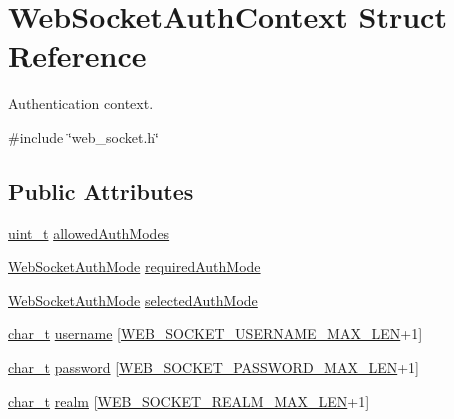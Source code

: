 \hypertarget{structWebSocketAuthContext}{}\section{Web\+Socket\+Auth\+Context Struct Reference}
\label{structWebSocketAuthContext}


Authentication context.  




{\ttfamily \#include \char`\"{}web\+\_\+socket.\+h\char`\"{}}

\subsection*{Public Attributes}
\begin{DoxyCompactItemize}
\item 
\hyperlink{compiler__port_8h_a12a1e9b3ce141648783a82445d02b58d}{uint\+\_\+t} \hyperlink{structWebSocketAuthContext_adb63e01f01d517c51fec717e2d3cf21e}{allowed\+Auth\+Modes}
\item 
\hyperlink{web__socket_8h_a2c2f8d99948379e06bb22ea64745ba77}{Web\+Socket\+Auth\+Mode} \hyperlink{structWebSocketAuthContext_a50c3cdd7ca2e85e2f1de07c0312320aa}{required\+Auth\+Mode}
\item 
\hyperlink{web__socket_8h_a2c2f8d99948379e06bb22ea64745ba77}{Web\+Socket\+Auth\+Mode} \hyperlink{structWebSocketAuthContext_ab75d64b66c1e870bea0affdc5c2bf492}{selected\+Auth\+Mode}
\item 
\hyperlink{compiler__port_8h_a40bb5262bf908c328fbcfbe5d29d0201}{char\+\_\+t} \hyperlink{structWebSocketAuthContext_a69b8df5c2bf4a6849bec5f2c84068da9}{username} \mbox{[}\hyperlink{web__socket_8h_a60c61570c0a031b8e8108cb162a098e5}{W\+E\+B\+\_\+\+S\+O\+C\+K\+E\+T\+\_\+\+U\+S\+E\+R\+N\+A\+M\+E\+\_\+\+M\+A\+X\+\_\+\+L\+EN}+1\mbox{]}
\item 
\hyperlink{compiler__port_8h_a40bb5262bf908c328fbcfbe5d29d0201}{char\+\_\+t} \hyperlink{structWebSocketAuthContext_af6fc321cd2597378b1086cfe03858830}{password} \mbox{[}\hyperlink{web__socket_8h_a4c69773275a97b429a126bce01074215}{W\+E\+B\+\_\+\+S\+O\+C\+K\+E\+T\+\_\+\+P\+A\+S\+S\+W\+O\+R\+D\+\_\+\+M\+A\+X\+\_\+\+L\+EN}+1\mbox{]}
\item 
\hyperlink{compiler__port_8h_a40bb5262bf908c328fbcfbe5d29d0201}{char\+\_\+t} \hyperlink{structWebSocketAuthContext_ae54b0e674cf0be7223519ecb9ff9c9cd}{realm} \mbox{[}\hyperlink{web__socket_8h_ae74a00b949ab02514b90f9783031b311}{W\+E\+B\+\_\+\+S\+O\+C\+K\+E\+T\+\_\+\+R\+E\+A\+L\+M\+\_\+\+M\+A\+X\+\_\+\+L\+EN}+1\mbox{]}

\end{DoxyCompactItemize}
